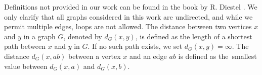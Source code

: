 Definitions not provided in our work can be found in the book  by R. Diestel \cite{Diestel2010}.
We only clarify that all graphs considered in this work are undirected, and while we permit multiple edges, loops are not allowed. 
The distance between two vertices $x$ and $y$ in a graph $G$, denoted by $d_G(x,y)$, is defined as the length of a shortest path between $x$ and $y$ in $G$. If no such path exists, we set $d_G(x,y)=\infty$. The distance $d_G(x, ab)$ between a vertex $x$ and an edge $ab$ is defined as the~smallest value between $d_G(x,a)$ and $d_G(x,b)$.
